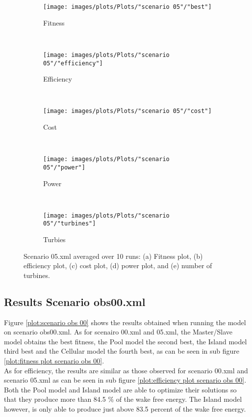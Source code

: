 \begin{figure}[h!]
    \centering
      \begin{subfigure}[b]{0.31\textwidth}
        \texttt{[image: images/plots/Plots/"scenario 05"/"best"]}
        \caption{Fitness}
        \hfill
        \label{plot:fitness plot scenario 05}
    \end{subfigure}
    ~
      \begin{subfigure}[b]{0.31\textwidth}
        \texttt{[image: images/plots/Plots/"scenario 05"/"efficiency"]}
        \caption{Efficiency}
        \hfill
        \label{plot:efficiency plot scenario 05}
    \end{subfigure}
    ~
    \begin{subfigure}[b]{0.31\textwidth}
        \texttt{[image: images/plots/Plots/"scenario 05"/"cost"]}
        \caption{Cost}
        \hfill
        \label{plot:cost plot scenario 05}
    \end{subfigure}
    ~
    \begin{subfigure}[b]{0.31\textwidth}
        \texttt{[image: images/plots/Plots/"scenario 05"/"power"]}
        \caption{Power}
        \hfill
        \label{plot:power plot scenario 05}
    \end{subfigure}
    ~
    \begin{subfigure}[b]{0.31\textwidth}
        \texttt{[image: images/plots/Plots/"scenario 05"/"turbines"]}
        \caption{Turbies}
        \hfill
        \label{plot:turbines plot scenario 05}
    \end{subfigure}
    \caption{Scenario 05.xml averaged over 10 runs: (a) Fitness plot, (b) efficiency plot, (c) cost plot, (d) power plot, and (e) number of turbines.}
    \label{plot:scenario 05}
\end{figure}


\subsection{Results Scenario obs00.xml}
Figure \ref{plot:scenario obs 00} shows the results obtained when running the model on scenario obs00.xml. As for scenairo 00.xml and 05.xml, the Master/Slave model obtains the best fitness, the Pool model the second best, the Island model third best and the Cellular model the fourth best, as can be seen in sub figure \ref{plot:fitness plot scenario obs 00}.\\


\noindent As for efficiency, the results are similar as those observed for scenario 00.xml and scenario 05.xml as can be seen in sub figure \ref{plot:efficiency plot scenario obs 00}. Both the Pool model and Island model are able to optimize their solutions so that they produce more than 84.5 \% of the wake free energy. The Island model however, is only able to produce just above 83.5 percent of the wake free energy.\\



